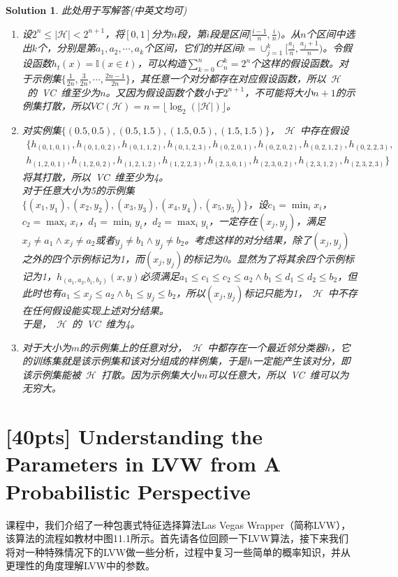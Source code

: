 \documentclass[a4paper,UTF8]{article}
\newtheorem*{solution}{Solution}
\numberwithin{equation}{section}
\begin{document}
\begin{solution}
此处用于写解答(中英文均可)
\begin{enumerate}[(1)]
    \item 设$2^n\leq\vert\mathcal H\vert< 2^{n+1}$，将$[0,1]$分为$n$段，第$i$段是区间$[\frac{i-1}{n},\frac{i}{n})$。从$n$个区间中选出$k$个，分别是第$a_1,a_2,\cdots,a_k$个区间，它们的并区间$t=\cup_{j=1}^{k}[\frac{a_j}{n},\frac{a_j+1}{n})$。令假设函数$h_t(x)=\mathbb{I}(x\in t)$，可以构造$\sum_{k=0}^n C_n^k=2^n$个这样的假设函数。对于示例集$\{\frac{1}{2n},\frac{3}{2n},\cdots,\frac{2n-1}{2n}\}$，其任意一个对分都存在对应假设函数，所以~$\mathcal H$~的~VC~维至少为$n$。又因为假设函数个数小于$2^{n+1}$，不可能将大小$n+1$的示例集打散，所以$VC(\mathcal H)=n=\lfloor\log_2(\left| \mathcal{H} \right|)\rfloor$。
    \item 对实例集$\{(0.5, 0.5), (0.5, 1.5), (1.5, 0.5), (1.5, 1.5)\}$，~$\mathcal H$~中存在假设
    \begin{multline*}
    \{h_{(0, 1, 0, 1)}, h_{(0, 1, 0, 2)}, h_{(0, 1, 1, 2)}, h_{(0, 1, 2, 3)}, h_{(0, 2, 0, 1)}, h_{(0, 2, 0, 2)}, h_{(0, 2, 1, 2)}, h_{(0, 2, 2, 3)},\\
    h_{(1, 2, 0, 1)}, h_{(1, 2, 0, 2)}, h_{(1, 2, 1, 2)}, h_{(1, 2, 2, 3)}, h_{(2, 3, 0, 1)}, h_{(2, 3, 0, 2)}, h_{(2, 3, 1, 2)}, h_{(2, 3, 2, 3)}\}
    \end{multline*}
    将其打散，所以~VC~维至少为4。\\
    对于任意大小为5的示例集$\{(x_1, y_1), (x_2, y_2), (x_3, y_3), (x_4, y_4), (x_5, y_5)\}$，设$c_1=\min_i x_i$，$c_2=\max_i x_i$，$d_1=\min_i y_i$，$d_2=\max_i y_i$，一定存在$(x_j,y_j)$，满足$x_j\neq a_1\land x_j\neq a_2$或者$y_j\neq b_1\land y_j\neq b_2$。考虑这样的对分结果，除了$(x_j,y_j)$之外的四个示例标记为1，而$(x_j,y_j)$的标记为0。显然为了将其余四个示例标记为1，$h_{(a_1, a_2, b_1, b_2)}(x, y)$必须满足$a_1\leq c_1\leq c_2\leq a_2\land b_1\leq d_1\leq d_2\leq b_2$，但此时也有$a_1\leq x_j\leq a_2\land b_1\leq y_j\leq b_2$，所以$(x_j,y_j)$标记只能为1，~$\mathcal H$~中不存在任何假设能实现上述对分结果。\\
    于是，~$\mathcal H$~的~VC~维为4。
    \item 对于大小为$m$的示例集上的任意对分，~$\mathcal H$~中都存在一个最近邻分类器$h$，它的训练集就是该示例集和该对分组成的样例集，于是$h$一定能产生该对分，即该示例集能被~$\mathcal{H}$~打散。因为示例集大小$m$可以任意大，所以~VC~维可以为无穷大。
\end{enumerate}
\end{solution}

\section{\textbf{[40pts]} Understanding the Parameters in LVW from A Probabilistic Perspective}
课程中，我们介绍了一种包裹式特征选择算法Las Vegas Wrapper（简称LVW），该算法的流程如教材中图11.1所示。首先请各位回顾一下LVW算法，接下来我们将对一种特殊情况下的LVW做一些分析，过程中复习一些简单的概率知识，并从更理性的角度理解LVW中的参数。
\end{document}
